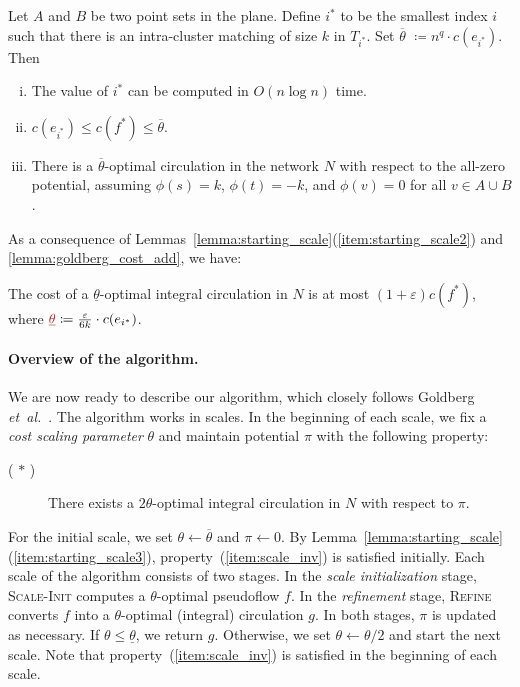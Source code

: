 \documentclass[11pt,twoside]{article}
\makeatletter
\def\etal{\emph{et~al.}}
\def\etal{\textit{et~al.}}
\def\eps{\varepsilon}
\def\fsupply{\phi}
\def\cost{c}
\theoremstyle{plain}
\numberwithin{figure}{section}
\renewcommand{\subparagraph}{\paragraph}
\def\EMPH#1{\textcolor{BrickRed}{{\emph{#1}}}}
\def\namedlabel#1#2{\begingroup
    #2%
    \def\@currentlabel{#2}%
    \phantomsection\label{#1}\endgroup
}
\makeatother
\begin{document}
\begin{lemma}
\label{lemma:starting_scale}
Let $A$ and $B$ be two point sets in the plane.
Define \EMPH{$i^*$} to be the smallest index $i$ such that there is an
intra-cluster matching of size $k$ in $T_{i^*}$.
Set \EMPH{$\overline{\theta}$} $\coloneqq n^q \cdot c(e_{i^*})$.
Then
\begin{enumerate}[(i)]
\item \label{item:starting_scale1}
	The value of $i^*$ can be computed in $O(n\log n)$ time.
\item \label{item:starting_scale2}
	$c(e_{i^*}) \leq \cost(f^*) \leq \overline{\theta}$.
\item \label{item:starting_scale3}
	There is a $\overline{\theta}$-optimal circulation in the network $N$ with
	respect to the all-zero potential, assuming $\fsupply(s) = k$,
	$\fsupply(t) = -k$, and $\fsupply(v) = 0$ for all $v \in A \cup B$.
\end{enumerate}
\end{lemma}

As a consequence of Lemmas~\ref{lemma:starting_scale}(\ref{item:starting_scale2})
and \ref{lemma:goldberg_cost_add}, we have:
%
\begin{corollary}
\label{corollary:goldberg_approx}
The cost of a $\underline{\theta}$-optimal integral circulation in $N$ is at
most $(1+\eps) \cost(f^*)$,
where $\EMPH{$\underline{\theta}$} \coloneqq \frac{\eps}{6k} \cdot c(e_{i^*})$.
\end{corollary}

\subparagraph{Overview of the algorithm.}
We are now ready to describe our algorithm, which closely follows Goldberg \etal~\cite{GHKT17}.
The algorithm works in scales.
In the beginning of each scale, we fix a \EMPH{cost scaling parameter}
\EMPH{$\theta$} and maintain potential $\pi$ with the following property:

\begin{description}
\item[(\namedlabel{item:scale_inv}{$\ast$})]
	There exists a $2\theta$-optimal integral circulation in $N$ with respect to $\pi$.
\end{description}

For the initial scale, we set $\theta \gets \overline{\theta}$ and $\pi \gets 0$.
By Lemma~\ref{lemma:starting_scale}(\ref{item:starting_scale3}),
property~(\ref{item:scale_inv}) is satisfied initially.
Each scale of the algorithm consists of two stages.
In the \EMPH{scale initialization} stage, \textsc{Scale-Init}
computes a $\theta$-optimal pseudoflow $f$.
In the \EMPH{refinement} stage, \textsc{Refine} converts $f$ into
a $\theta$-optimal (integral) circulation $g$.
In both stages, $\pi$ is updated as necessary.
If $\theta \leq \underline{\theta}$, we return $g$.
Otherwise, we set $\theta \gets \theta/2$ and start the next scale.
Note that property~(\ref{item:scale_inv}) is satisfied in the beginning of each scale.
\end{document}
